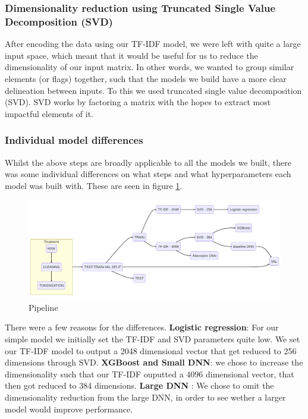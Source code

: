 \subsubsection{Dimensionality reduction using Truncated Single Value Decomposition (SVD)}
After encoding the data using our TF-IDF model, we were left with quite a large input space, which meant that it would
be useful for us to reduce the dimensionality of our input matrix. In other words, we wanted to group similar elements
(or flags) together, such that the models we build have a more clear delineation between inputs. To this we used
truncated single value decomposition (SVD). SVD works by factoring a matrix with the hopes to extract most impactful
elements of it.

\subsubsection{Individual model differences}
Whilst the above steps are broadly applicable to all the models we built, there was some individual differences on what
steps and what hyperparameters each model was built with. These are seen in figure \ref{fig:pipeline}.

\begin{figure}[htpb]
  \centering
  \includegraphics[width=1\textwidth]{pipeline}
  \caption{Pipeline}
  \label{fig:pipeline}
\end{figure}

There were a few reasons for the differences. \textbf{Logistic regression}: For our simple model we initially set the TF-IDF and SVD parameters quite low. We
    set our TF-IDF model to output a 2048 dimensional vector that get reduced to 256 dimensions through SVD.
    \textbf{XGBoost and Small DNN}: we chose to increase the dimensionality such that our TF-IDF ouputted a 4096
    dimensional vector, that then got reduced to 384 dimensions. \textbf{Large DNN} : We chose to omit the
    dimensionality reduction from the large DNN, in order to see wether a larger model would improve performance.

